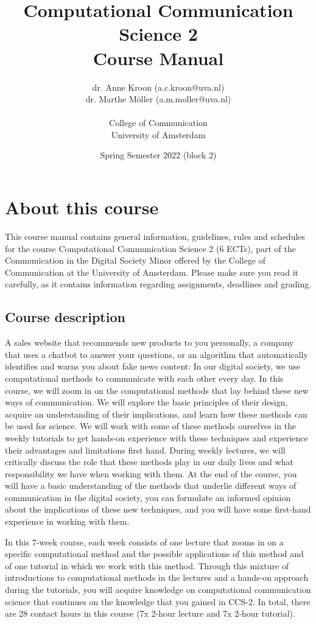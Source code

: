\documentclass[a4paper,10pt]{report}
\title{Computational Communication Science 2\\ Course Manual}
\author{dr. Anne Kroon (a.c.kroon@uva.nl)\\dr. Marthe Möller (a.m.moller@uva.nl) \\~\\College of Communication\\University of Amsterdam}
\date{Spring Semester 2022 (block 2)}
\begin{document}
	\maketitle
	
	\tableofcontents

	
	\chapter{About this course}
	
	This course manual contains general information, guidelines, rules and schedules for the course Computational Communication Science 2 (6 ECTs), part of the Communication in the Digital Society Minor offered by the College of Communication at the University of Amsterdam. Please make sure you read it carefully, as it  contains information regarding assignments, deadlines and grading.
	
	\section{Course description}
	
	A sales website that recommends new products to you personally, a company that uses a chatbot to answer your questions, or an algorithm that automatically identifies and warns you about fake news content: In our digital society, we use computational methods to communicate with each other every day. In this course, we will zoom in on the computational methods that lay behind these new ways of communication. We will explore the basic principles of their design, acquire an understanding of their implications, and learn how these methods can be used for science. We will work with some of these methods ourselves in the weekly tutorials to get hands-on experience with these techniques and experience their advantages and limitations first hand. During weekly lectures, we will critically discuss the role that these methods play in our daily lives and what responsibility we have when working with them. At the end of the course, you will have a basic understanding of the methods that underlie different ways of communication in the digital society, you can formulate an informed opinion about the implications of these new techniques, and you will have some first-hand experience in working with them.
	
	In this 7-week course, each week consists of one lecture that zooms in on a specific computational method and the possible applications of this method and of one tutorial in which we work with this method. Through this mixture of introductions to computational methods in the lectures and a hands-on approach during the tutorials, you will acquire knowledge on computational communication science that continues on the knowledge that you gained in CCS-2. In total, there are 28 contact hours in this course (7x 2-hour lecture and 7x 2-hour tutorial). 
	
\end{document}
